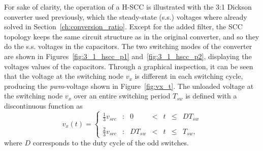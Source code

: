 For sake of clarity, the operation of a H-SCC is illustrated with the 3:1 Dickson converter used previously, which the steady-state (s.s.) voltages where already solved in Section~\ref{ch:conversion_ratio}. Except for the added filter, the SCC topology keeps the same circuit structure as in the original converter, and so they do the s.s. voltages in the capacitors. The two switching modes of the converter are shown in Figures~\ref{fig:3_1_hscc_p1} and~\ref{fig:3_1_hscc_p2}, displaying the voltages values of the capacitors. Through a graphical inspection, it can be seen that the voltage at the switching node $v_x$ is different in each switching cycle, producing the \emph{pwm}-voltage shown in Figure~\ref{fig:vx_t}. The unloaded voltage at the switching node $v_x$ over an entire switching period $T_{sw}$ is defined with a discontinuous function as
\begin{equation}
v_x(t) = \left\{
\begin{array}{lcccccr}
  \frac{1}{3} v_{src}   & : & 0   & < & t & \leq & D  T_{sw}  \\
  ~\\
   \frac{2}{3} v_{src} & : & D T_{sw} & < & t & \leq & T_{sw},
\end{array}
\right.
\label{eq:vx_t}
\end{equation}
where $D$ corresponds to the duty cycle of the odd switches.
